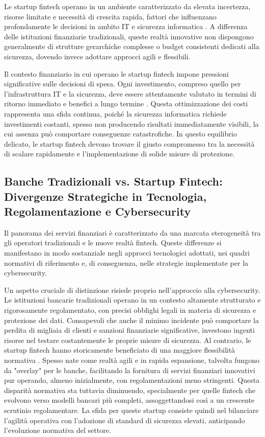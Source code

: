 Le startup fintech operano in un ambiente caratterizzato da elevata incertezza, risorse limitate e necessità di crescita rapida, fattori che influenzano profondamente le decisioni in ambito IT e sicurezza informatica \cite{fintechChallenges}. A differenza delle istituzioni finanziarie tradizionali, queste realtà innovative non dispongono generalmente di strutture gerarchiche complesse o budget consistenti dedicati alla sicurezza, dovendo invece adottare approcci agili e flessibili.

Il contesto finanziario in cui operano le startup fintech impone pressioni significative sulle decisioni di spesa. Ogni investimento, compreso quello per l'infrastruttura IT e la sicurezza, deve essere attentamente valutato in termini di ritorno immediato e benefici a lungo termine \cite{fintechChallenges}. Questa ottimizzazione dei costi rappresenta una sfida continua, poiché la sicurezza informatica richiede investimenti costanti, spesso non producendo risultati immediatamente visibili, la cui assenza può comportare conseguenze catastrofiche. In questo equilibrio delicato, le startup fintech devono trovare il giusto compromesso tra la necessità di scalare rapidamente e l'implementazione di solide misure di protezione.

\subsection{Banche Tradizionali vs. Startup Fintech: Divergenze Strategiche in Tecnologia, Regolamentazione e Cybersecurity}
Il panorama dei servizi finanziari è caratterizzato da una marcata eterogeneità tra gli operatori tradizionali e le nuove realtà fintech. Queste differenze si manifestano in modo sostanziale negli approcci tecnologici adottati, nei quadri normativi di riferimento e, di conseguenza, nelle strategie implementate per la cybersecurity.

Un aspetto cruciale di distinzione risiede proprio nell'approccio alla cybersecurity. Le istituzioni bancarie tradizionali operano in un contesto altamente strutturato e rigorosamente regolamentato, con precisi obblighi legali in materia di sicurezza e protezione dei dati. Consapevoli che anche il minimo incidente può comportare la perdita di migliaia di clienti e sanzioni finanziarie significative, investono ingenti risorse nel testare costantemente le proprie misure di sicurezza.
Al contrario, le startup fintech hanno storicamente beneficiato di una maggiore flessibilità normativa \cite{bankingVsFintech}. Spesso nate come realtà agili e in rapida espansione, talvolta fungono da "overlay" per le banche, facilitando la fornitura di servizi finanziari innovativi pur operando, almeno inizialmente, con regolamentazioni meno stringenti. Questa disparità normativa sta tuttavia diminuendo, specialmente per quelle fintech che evolvono verso modelli bancari più completi, assoggettandosi così a un crescente scrutinio regolamentare. La sfida per queste startup consiste quindi nel bilanciare l'agilità operativa con l'adozione di standard di sicurezza elevati, anticipando l'evoluzione normativa del settore.
\newline


